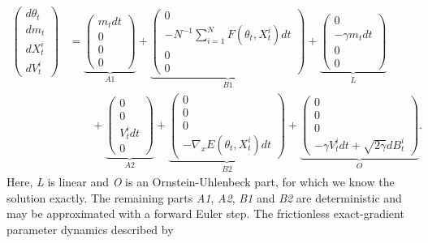 \begin{equation*}
    \begin{aligned}
    \begin{pmatrix}
        d\theta_t \\ dm_t \\ dX^i_t \\ dV^i_t
    \end{pmatrix} &= \underbrace{\begin{pmatrix}
    m_tdt \\ 0 \\ 0 \\ 0
    \end{pmatrix}}_{\textit{A1}} +
    \underbrace{\begin{pmatrix}
    0 \\ -N^{-1}\sum_{i=1}^N F(\theta_t,X_t^i)dt \\ 0 \\ 0
    \end{pmatrix}}_{\textit{B1}} +
    \underbrace{\begin{pmatrix}
    0 \\ -\gamma  m_tdt \\ 0 \\ 0
    \end{pmatrix}}_{\textit{L}} \\
    &\qquad + \underbrace{\begin{pmatrix}
    0 \\ 0 \\ V^i_tdt \\ 0
    \end{pmatrix}}_{\textit{A2}} +
    \underbrace{\begin{pmatrix}
    0 \\ 0 \\ 0 \\ -\nabla_x E(\theta_t,X_t^i)dt
    \end{pmatrix}}_{\textit{B2}} +
    \underbrace{\begin{pmatrix}
    0 \\ 0 \\ 0 \\ -\gamma V^i_tdt + \sqrt{2\gamma}dB^i_t
    \end{pmatrix}}_{\textit{O}}.
\end{aligned}
\end{equation*}
Here, \textit{L} is linear and \textit{O} is an Ornstein-Uhlenbeck part, for which we know the solution exactly. The remaining parts \textit{A1}, \textit{A2}, \textit{B1} and \textit{B2} are deterministic and may be approximated with a forward Euler step.  The frictionless exact-gradient parameter dynamics described by
